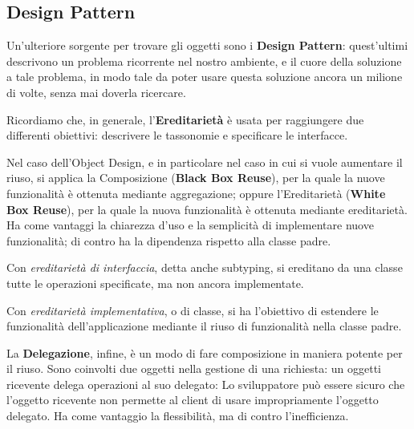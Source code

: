 \documentclass{article}
\begin{document}
    \subsection{Design Pattern}
    
        Un'ulteriore sorgente per trovare gli oggetti sono i \textbf{Design Pattern}: quest'ultimi descrivono un problema ricorrente nel nostro ambiente, e il cuore della soluzione a tale problema, in modo tale da poter usare questa soluzione ancora un milione di volte, senza mai doverla ricercare.
        
        \vspace{3mm}
        
        Ricordiamo che, in generale, l'\textbf{Ereditarietà} è usata per raggiungere due differenti obiettivi: descrivere le tassonomie e specificare le interfacce. 
        
        \vspace{3mm}
        
        Nel caso dell'Object Design, e in particolare nel caso in cui si vuole aumentare il riuso, si applica la Composizione (\textbf{Black Box Reuse}), per la quale la nuove funzionalità è ottenuta mediante aggregazione; oppure l'Ereditarietà (\textbf{White Box Reuse}), per la quale la nuova funzionalità è ottenuta mediante ereditarietà. Ha come vantaggi la chiarezza d'uso e la semplicità di implementare nuove funzionalità; di contro ha la dipendenza rispetto alla classe padre.
        
        \vspace{3mm}
        
        Con \textit{ereditarietà di interfaccia}, detta anche subtyping, si ereditano da una classe tutte le operazioni specificate, ma non ancora implementate.
        
        Con \textit{ereditarietà implementativa}, o di classe, si ha l'obiettivo di estendere le funzionalità dell'applicazione mediante il riuso di funzionalità nella classe padre.
        
        \vspace{3mm}
        
        La \textbf{Delegazione}, infine, è un modo di fare composizione in maniera potente per il riuso. Sono coinvolti due oggetti nella gestione di una richiesta: un oggetti ricevente delega operazioni al suo delegato: Lo sviluppatore può essere sicuro che l'oggetto ricevente non permette al client di usare impropriamente l'oggetto delegato. Ha come vantaggio la flessibilità, ma di contro l'inefficienza. 
        
\end{document}
